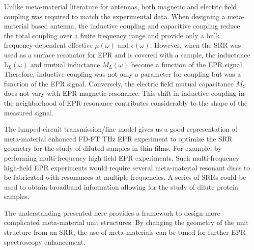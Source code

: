 Unlike meta-material literature for antennas, both magnetic and electric field coupling was required to match the experimental data. When designing a meta-material based antenna, the inductive coupling and capacitive coupling reduce the total coupling over a finite frequency range and provide only a bulk frequency-dependent effective $\mu(\omega)$ and $\epsilon(\omega)$. However, when the SRR was used as a surface resonator for EPR and is covered with a sample, the inductance L$_L(\omega)$ and mutual inductance $M_L(\omega)$ become a function of the EPR signal. Therefore, inductive coupling was not only a parameter for coupling but was a function of the EPR signal. Conversely, the electric field mutual capacitance $M_C$ does not vary with EPR magnetic resonance. This shift in inductive coupling in the neighborhood of EPR resonance contributes considerably to the shape of the measured signal.

The lumped-circuit transmission\-/line model gives us a good representation of meta-material enhanced FD-FT THz EPR experiment to optimize the SRR geometry for the study of diluted samples in thin films. For example, by performing multi-frequency high-field EPR experiments. \cite{KRZYSTEK2006,Telser2014} Such multi-frequency high-field EPR experiments would require several meta-material resonant discs to be fabricated with resonances at multiple frequencies. A series of SRRs could be used to obtain broadband information allowing for the study of dilute protein samples.

The understanding presented here provides a framework to design more complicated meta-material unit structures. By changing the geometry of the unit structure from an SRR, the use of meta-materials can be tuned for further EPR spectroscopy enhancement. \cite{ZhangMetasurfaces}


{\renewcommand{\bibsection}{\clearpage\section*{\bibname}\markboth{\bibname}{\bibname}}
\renewcommand{\bibname}{CHAPTER 4. REFERENCES}


}